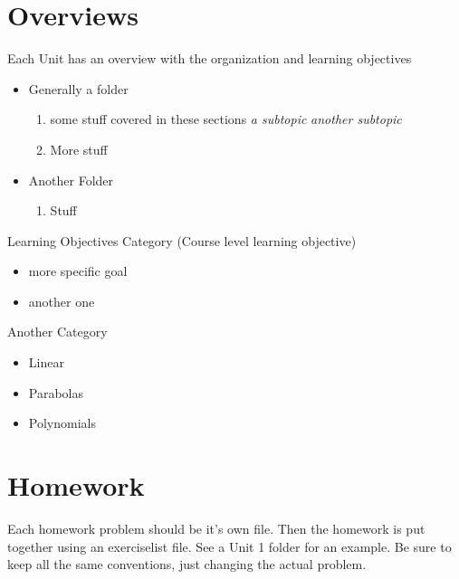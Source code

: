 \documentclass[nooutcomes]{ximera}
\begin{document}

\section{Overviews}

Each Unit has an overview with the organization and learning objectives

\begin{overview}\begin{itemize}
\item Generally a folder %
	\begin{enumerate}
	\item some stuff covered in these sections
		\textit{a subtopic} 
		\textit{another subtopic} 
	\item More stuff	
	\end{enumerate}	
\item Another Folder 
	\begin{enumerate}	
	\item Stuff 
	\end{enumerate} 
\end{itemize}\end{overview}


\begin{objectives}
\item Learning Objectives Category (Course level learning objective)
	\begin{itemize}
	\item more specific goal
	\item another one 
	\end{itemize}
\item Another Category
	\begin{itemize}
	\item Linear 
	\item Parabolas 
	\item Polynomials 
	\end{itemize}
\end{objectives}




\newpage


\section{Homework}
Each homework problem should be it's own file.  Then the homework is put together using an exerciselist file.  See a Unit 1 folder for an example.  Be sure to keep all the same conventions, just changing the actual problem.  
\end{document}
